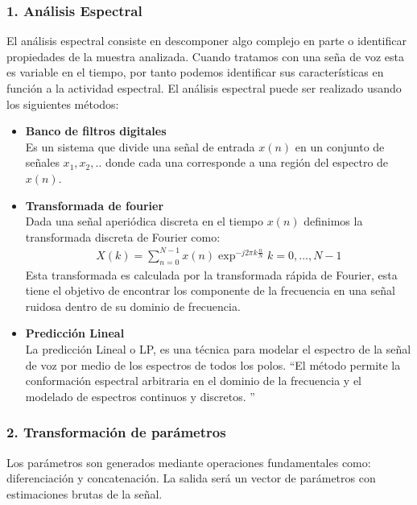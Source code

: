 \subsubsection{1. Análisis Espectral}
El análisis espectral consiste en descomponer algo complejo en parte o identificar propiedades de la muestra analizada.
Cuando tratamos con una seña de voz esta es variable en el tiempo, por tanto podemos identificar sus características en función a la actividad espectral. El análisis espectral puede ser realizado usando los siguientes métodos:
\begin{itemize}
	\item \textbf{Banco de filtros digitales\\}
	Es un sistema que divide una señal de entrada $x(n)$ en un conjunto de señales $x_{1},x_{2},..$ donde cada una corresponde a una región del espectro de $x(n)$.
	\item \textbf{Transformada de fourier\\}
	Dada una señal aperiódica discreta en el tiempo $x(n)$ definimos la transformada discreta de Fourier como:
	\begin{equation}
	\label{STgl}
	\begin{aligned}
		X(k)=\sum_{n=0}^{N-1}x(n)\exp^{-j2\pi k \frac{n}{N}} k=0, ..., N-1
	\end{aligned}
	\end{equation}
	Esta transformada es calculada por la transformada rápida de Fourier, esta tiene el objetivo de encontrar los componente de la frecuencia en una señal ruidosa dentro de su dominio de frecuencia.
	\item \textbf{Predicción Lineal\\}
	La predicción Lineal o LP, es una técnica para modelar el espectro de la señal de voz por medio de los espectros de todos los polos. \textquotedblleft El método permite la conformación espectral arbitraria en el dominio de la frecuencia y el modelado de espectros continuos y discretos. \textquotedblright \cite{LP}
\end{itemize}


\subsubsection{2. Transformación de parámetros}
Los parámetros son generados mediante operaciones fundamentales como: diferenciación y concatenación. La salida será un vector de parámetros con estimaciones brutas de la señal.

